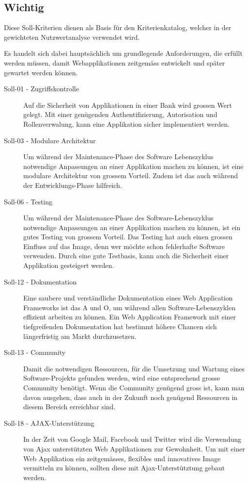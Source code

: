   \subsection{Wichtig}
  
  Diese Soll-Kriterien dienen als Basis für den Kriterienkatalog, welcher in der
  gewichteten Nutzwertanalyse verwendet wird.
  
  Es handelt sich dabei hauptsächlich um grundlegende Anforderungen, die
  erfüllt werden müssen, damit Webapplikationen zeitgemäss entwickelt und
  später gewartet werden können.
  \newline
  
  \begin{description}
  \item[Soll-01 - Zugriffskontrolle]
  Auf die Sicherheit von Applikationen in einer Bank wird grossen Wert
  gelegt. Mit einer genügenden Authentifizierung, Autorisation und
  Rollenverwalung, kann eine Applikation sicher implementiert werden.
  
  \item[Soll-03 - Modulare Architektur]
  Um während der Maintenance-Phase des Software Lebenszyklus notwendige
  Anpassungen an einer Applikation machen zu können, ist eine modulare
  Architektur von grossem Vorteil. Zudem ist das auch während der
  Entwicklungs-Phase hilfreich.
  
  \item[Soll-06 - Testing]
  Um während der Maintenance-Phase des Software-Lebenszyklus notwendige
  Anpassungen an einer Applikation machen zu können, ist ein gutes Testing von
  grossem Vorteil. Das Testing hat auch einen grossen Einfluss auf das Image,
  denn wer möchte schon fehlerhafte Software verwenden. Durch eine gute
  Testbasis, kann auch die Sicherheit einer Applikation gesteigert werden.
  
  \item[Soll-12 - Dokumentation]
  Eine saubere und verständliche Dokumentation eines Web Application Frameworks
  ist das A und O, um während allen Software-Lebenszyklen effizient arbeiten zu
  können. Ein Web Application Framework mit einer tiefgreifenden Dokumentation
  hat bestimmt höhere Chancen sich längerfristig am Markt durchzusetzen.
  
  \item[Soll-13 - Community]
  Damit die notwendigen Ressourcen, für die Umsetzung und Wartung eines
  Software-Projekts gefunden werden, wird eine entsprechend grosse Community
  benötigt. Wenn die Community genügend gross ist, kann man davon ausgehen,
  dass auch in der Zukunft noch genügend Ressourcen in diesem Bereich
  erreichbar sind.
  
  \item[Soll-18 - AJAX-Unterstützung]
  In der Zeit von Google Mail, Facebook und Twitter wird die Verwendung von
  \ac{Ajax} unterstützten Web Applikationen zur Gewohnheit. Um mit einer Web
  Applikation ein zeitgemässes, flexibles und innovatives Image vermitteln zu
  können, sollten diese mit \ac{Ajax}-Unterstütztung gebaut werden.
  \end{description}
  
